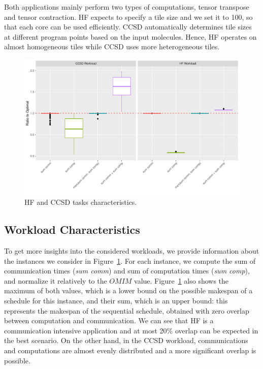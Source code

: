 \documentclass[runningheads]{llncs} %
\begin{document}
Both applications mainly perform two types of computations, tensor transpose and tensor contraction. HF expects to specify a tile size and we set it to 100, so that each core can be used efficiently. CCSD automatically determines tile sizes at different program points based on the input molecules. Hence, HF operates on almost homogeneous tiles while CCSD uses more heterogeneous tiles.
	
		\begin{figure}[htb]
		\begin{center}
			\includegraphics[scale=0.5]{./application_properties.pdf}
			\caption{HF and CCSD tasks characteristics.}
			\label{fig:ApplicationProperties}
		\end{center}
		\end{figure}	
	
	\subsection{Workload Characteristics}
	

		To get more insights into the considered workloads, we provide  information about the instances we consider in Figure~\ref{fig:ApplicationProperties}. For each instance, we compute the sum of communication times (\textit{sum comm}) and sum of computation times  (\textit{sum comp}), and normalize it relatively to the $OMIM$ value. Figure~\ref{fig:ApplicationProperties} also shows the maximum of both values, which is a lower bound on the possible makespan of a schedule for this instance, and their sum, which is an upper bound: this represents the makespan of the sequential schedule, obtained with zero overlap between computation and communication. We can see that HF is a communication intensive application and at most 20\% overlap can be expected in the best scenario. On the other hand, in the CCSD workload, communications and computations are almost evenly distributed and a more significant overlap is possible.
	
\end{document}
